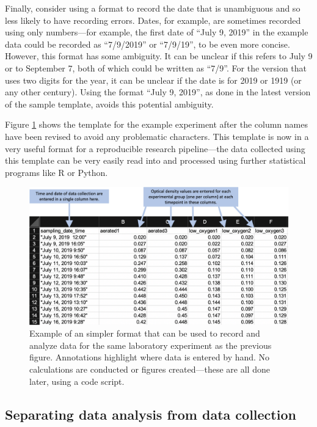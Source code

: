 \documentclass[]{tufte-book}
\begin{document}
Finally, consider using a format to record the date that is unambiguous and so less likely
to have recording errors. Dates, for example, are sometimes recorded using only numbers---for
example, the first date of ``July 9, 2019'' in the example data could be recorded as
``7/9/2019'' or ``7/9/19'', to be even more concise. However, this format has some ambiguity.
It can be unclear if this refers to July 9 or to September 7, both of which could be
written as ``7/9''. For the version that uses two digits for the year, it can be unclear
if the date is for 2019 or 1919 (or any other century). Using the format ``July 9, 2019'',
as done in the latest version of the sample template, avoids this potential ambiguity.

Figure \ref{fig:growthsimple2} shows the template for the example experiment after the
column names have been revised to avoid any problematic characters. This template is now in
a very useful format for a reproducible research pipeline---the data collected using this
template can be very easily read into and processed using further statistical programs like
R or Python.

\begin{figure}
\includegraphics[width=\textwidth]{figures/growth_curve_simple} \caption[Example of an simpler format that can be used to record and analyze data for the same laboratory experiment as the previous figure]{Example of an simpler format that can be used to record and analyze data for the same laboratory experiment as the previous figure. Annotations highlight where data is entered by hand. No calculations are conducted or figures created---these are all done later, using a code script.}\label{fig:growthsimple2}
\end{figure}

\subsection{Separating data analysis from data collection}\label{separating-data-analysis-from-data-collection}
\end{document}
